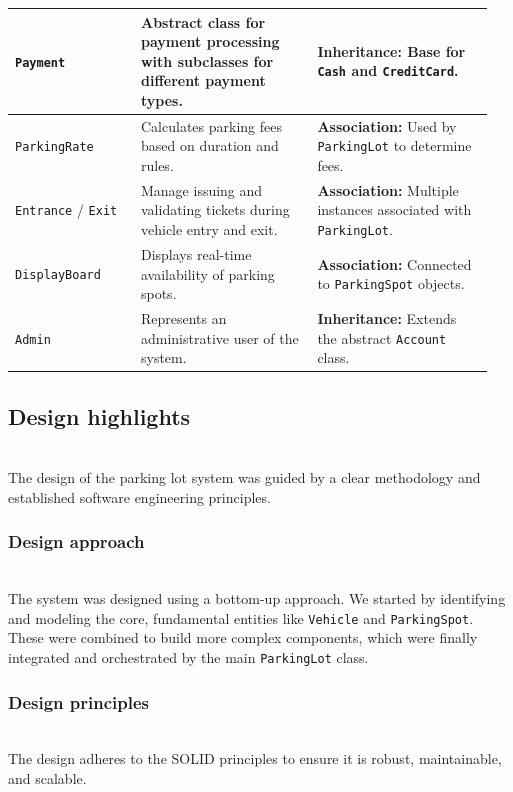 \begin{center}
\begin{longtable}{|p{0.25\linewidth}|p{0.35\linewidth}|p{0.35\linewidth}|}
\texttt{Payment} &
Abstract class for payment processing with subclasses for different payment types. &
\textbf{Inheritance:} Base for \texttt{Cash} and \texttt{CreditCard}. \\
\hline

\texttt{ParkingRate} &
Calculates parking fees based on duration and rules. &
\textbf{Association:} Used by \texttt{ParkingLot} to determine fees. \\
\hline

\texttt{Entrance} / \texttt{Exit} &
Manage issuing and validating tickets during vehicle entry and exit. &
\textbf{Association:} Multiple instances associated with \texttt{ParkingLot}. \\
\hline

\texttt{DisplayBoard} &
Displays real-time availability of parking spots. &
\textbf{Association:} Connected to \texttt{ParkingSpot} objects. \\
\hline

\texttt{Admin} &
Represents an administrative user of the system. &
\textbf{Inheritance:} Extends the abstract \texttt{Account} class. \\
\hline

\end{longtable}

\end{center}


\subsection{Design highlights}\label{5k3J-gWX3iPnd69Sn_VpJ}
\\
The design of the parking lot system was guided by a clear methodology and established software engineering principles.

\subsubsection{Design approach}\label{aA750NXB8pT0dtwEPcibC}
\\
The system was designed using a bottom-up approach. We started by identifying and modeling the core, fundamental entities like \texttt{Vehicle} and \texttt{ParkingSpot}. These were combined to build more complex components, which were finally integrated and orchestrated by the main \texttt{ParkingLot} class.

\subsubsection{Design principles}\label{VomoINTCI_YfiyNJDgtMp}
\\
The design adheres to the SOLID principles to ensure it is robust, maintainable, and scalable.


